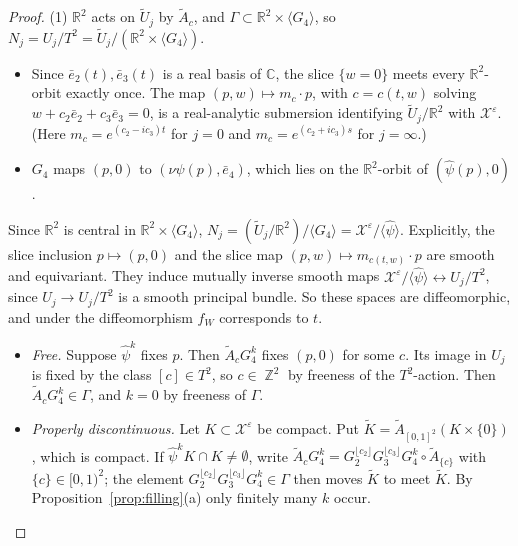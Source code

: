 \documentclass{article}
\DeclareMathOperator{\Z}{\mathbb{Z}}
\theoremstyle{definition}
\theoremstyle{plain}
\newcommand{\R}{\mathbb{R}}
\newcommand{\C}{\mathbb{C}}
\newcommand{\cX}{\mathcal{X}}
\newcommand{\eb}{\bar e}
\newcommand{\Ut}{\widetilde{U}}
\begin{document}
\begin{proof}
(1) $\R^2$ acts on $\Ut_j$ by $\tilde A_c$, and $\Gamma\subset\R^2\times\langle G_4\rangle$, so
$N_j=U_j/T^2=\Ut_j/(\R^2\times\langle G_4\rangle)$.
\begin{itemize}
\item Since $\eb_2(t),\eb_3(t)$ is a real basis of $\C$, the slice $\{w=0\}$ meets every
  $\R^2$-orbit exactly once. The map
  $(p,w)\mapsto m_c\cdot p$, with $c=c(t,w)$ solving $w+c_2\eb_2+c_3\eb_3=0$, is a
  real-analytic submersion identifying $\Ut_j/\R^2$ with $\cX^\varepsilon$. (Here
  $m_c=e^{(c_2-ic_3)t}$ for $j=0$ and $m_c=e^{(c_2+ic_3)s}$ for $j=\infty$.)
\item $G_4$ maps $(p,0)$ to $(\nu\psi(p),\eb_4)$, which lies on the $\R^2$-orbit of
  $(\hat\psi(p),0)$.
\end{itemize}
Since $\R^2$ is central in $\R^2\times\langle G_4\rangle$,
$N_j=(\Ut_j/\R^2)/\langle G_4\rangle=\cX^\varepsilon/\langle\hat\psi\rangle$. Explicitly, the
slice inclusion $p\mapsto(p,0)$ and the slice map $(p,w)\mapsto m_{c(t,w)}\cdot p$ are
smooth and equivariant. They induce mutually inverse smooth maps
$\cX^\varepsilon/\langle\hat\psi\rangle\leftrightarrow U_j/T^2$, since $U_j\to U_j/T^2$ is a
smooth principal bundle. So these spaces are diffeomorphic, and under the
diffeomorphism $f_W$ corresponds to $t$.
\begin{itemize}
\item \emph{Free.} Suppose $\hat\psi^k$ fixes $p$. Then $\tilde A_cG_4^k$ fixes $(p,0)$ for
  some $c$. Its image in $U_j$ is fixed by the class $[c]\in T^2$, so $c\in\Z^2$ by
  freeness of the $T^2$-action. Then $\tilde A_cG_4^k\in\Gamma$, and $k=0$ by freeness of
  $\Gamma$.
\item \emph{Properly discontinuous.} Let $K\subset\cX^\varepsilon$ be compact. Put
  $\widetilde K=\tilde A_{[0,1]^2}(K\times\{0\})$, which is compact. If
  $\hat\psi^kK\cap K\ne\emptyset$, write $\tilde A_cG_4^k=G_2^{\lfloor c_2\rfloor}G_3^{\lfloor c_3\rfloor}G_4^k\circ
  \tilde A_{\{c\}}$ with $\{c\}\in[0,1)^2$; the element
  $G_2^{\lfloor c_2\rfloor}G_3^{\lfloor c_3\rfloor}G_4^k\in\Gamma$ then moves $\widetilde K$ to meet
  $\widetilde K$. By Proposition~\ref{prop:filling}(a) only finitely many $k$ occur.
\end{itemize}


\end{proof}
\end{document}
